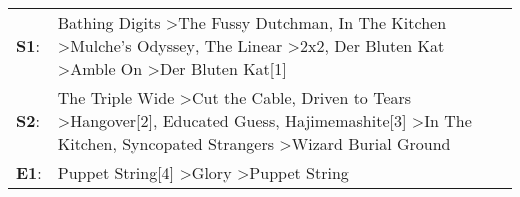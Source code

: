 \begin{supertabular}{p{0.03\textwidth}p{0.92\textwidth}}
 \textbf{S1}:  &              Bathing Digits\textsuperscript{} \textgreater \enspace The Fussy Dutchman\textsuperscript{}, \enspace In The Kitchen\textsuperscript{} \textgreater \enspace Mulche's Odyssey\textsuperscript{}, \enspace The Linear\textsuperscript{} \textgreater \enspace 2x2\textsuperscript{}, \enspace Der Bluten Kat\textsuperscript{} \textgreater \enspace Amble On\textsuperscript{} \textgreater \enspace Der Bluten Kat[1]\textsuperscript{}  \enspace  \\
 \textbf{S2}:  &  The Triple Wide\textsuperscript{} \textgreater \enspace Cut the Cable\textsuperscript{}, \enspace Driven to Tears\textsuperscript{} \textgreater \enspace Hangover[2]\textsuperscript{}, \enspace Educated Guess\textsuperscript{}, \enspace Hajimemashite[3]\textsuperscript{} \textgreater \enspace In The Kitchen\textsuperscript{}, \enspace Syncopated Strangers\textsuperscript{} \textgreater \enspace Wizard Burial Ground\textsuperscript{}  \enspace  \\
 \textbf{E1}:  &                                                                                                                                                                                                                                                                                                                Puppet String[4]\textsuperscript{} \textgreater \enspace Glory\textsuperscript{} \textgreater \enspace Puppet String\textsuperscript{}  \enspace  \\
\end{supertabular}
